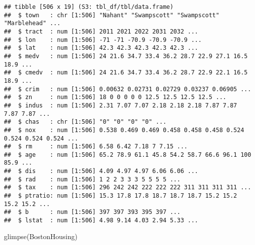 \documentclass[
]{book}
\newenvironment{Shaded}{\begin{snugshade}}{\end{snugshade}}
\newcommand{\FunctionTok}[1]{\textcolor[rgb]{0.00,0.00,0.00}{#1}}
\newcommand{\FunctionTok}[1]{\textcolor[rgb]{0.13,0.29,0.53}{\textbf{#1}}}
\newcommand{\NormalTok}[1]{#1}
\begin{document}
\begin{verbatim}
## tibble [506 x 19] (S3: tbl_df/tbl/data.frame)
##  $ town   : chr [1:506] "Nahant" "Swampscott" "Swampscott" "Marblehead" ...
##  $ tract  : num [1:506] 2011 2021 2022 2031 2032 ...
##  $ lon    : num [1:506] -71 -71 -70.9 -70.9 -70.9 ...
##  $ lat    : num [1:506] 42.3 42.3 42.3 42.3 42.3 ...
##  $ medv   : num [1:506] 24 21.6 34.7 33.4 36.2 28.7 22.9 27.1 16.5 18.9 ...
##  $ cmedv  : num [1:506] 24 21.6 34.7 33.4 36.2 28.7 22.9 22.1 16.5 18.9 ...
##  $ crim   : num [1:506] 0.00632 0.02731 0.02729 0.03237 0.06905 ...
##  $ zn     : num [1:506] 18 0 0 0 0 0 12.5 12.5 12.5 12.5 ...
##  $ indus  : num [1:506] 2.31 7.07 7.07 2.18 2.18 2.18 7.87 7.87 7.87 7.87 ...
##  $ chas   : chr [1:506] "0" "0" "0" "0" ...
##  $ nox    : num [1:506] 0.538 0.469 0.469 0.458 0.458 0.458 0.524 0.524 0.524 0.524 ...
##  $ rm     : num [1:506] 6.58 6.42 7.18 7 7.15 ...
##  $ age    : num [1:506] 65.2 78.9 61.1 45.8 54.2 58.7 66.6 96.1 100 85.9 ...
##  $ dis    : num [1:506] 4.09 4.97 4.97 6.06 6.06 ...
##  $ rad    : num [1:506] 1 2 2 3 3 3 5 5 5 5 ...
##  $ tax    : num [1:506] 296 242 242 222 222 222 311 311 311 311 ...
##  $ ptratio: num [1:506] 15.3 17.8 17.8 18.7 18.7 18.7 15.2 15.2 15.2 15.2 ...
##  $ b      : num [1:506] 397 397 393 395 397 ...
##  $ lstat  : num [1:506] 4.98 9.14 4.03 2.94 5.33 ...
\end{verbatim}

\begin{Shaded}
\begin{Highlighting}[]
\FunctionTok{glimpse}\NormalTok{(BostonHousing)}
\end{Highlighting}
\end{Shaded}
\end{document}
